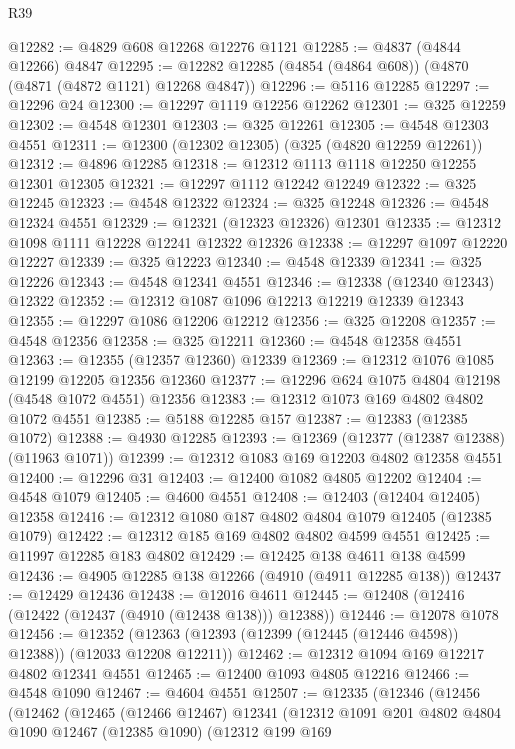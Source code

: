 \begin{lexlean}{R39}
\begin{coremodule}
@12282 := @4829 @608 @12268 @12276 @1121
@12285 := @4837 (@4844 @12266) @4847
@12295 := @12282 @12285 (@4854 (@4864 @608)) (@4870 (@4871 (@4872 @1121) @12268 @4847))
@12296 := @5116 @12285
@12297 := @12296 @24
@12300 := @12297 @1119 @12256 @12262
@12301 := @325 @12259
@12302 := @4548 @12301
@12303 := @325 @12261
@12305 := @4548 @12303 @4551
@12311 := @12300 (@12302 @12305) (@325 (@4820 @12259 @12261))
@12312 := @4896 @12285
@12318 := @12312 @1113 @1118 @12250 @12255 @12301 @12305
@12321 := @12297 @1112 @12242 @12249
@12322 := @325 @12245
@12323 := @4548 @12322
@12324 := @325 @12248
@12326 := @4548 @12324 @4551
@12329 := @12321 (@12323 @12326) @12301
@12335 := @12312 @1098 @1111 @12228 @12241 @12322 @12326
@12338 := @12297 @1097 @12220 @12227
@12339 := @325 @12223
@12340 := @4548 @12339
@12341 := @325 @12226
@12343 := @4548 @12341 @4551
@12346 := @12338 (@12340 @12343) @12322
@12352 := @12312 @1087 @1096 @12213 @12219 @12339 @12343
@12355 := @12297 @1086 @12206 @12212
@12356 := @325 @12208
@12357 := @4548 @12356
@12358 := @325 @12211
@12360 := @4548 @12358 @4551
@12363 := @12355 (@12357 @12360) @12339
@12369 := @12312 @1076 @1085 @12199 @12205 @12356 @12360
@12377 := @12296 @624 @1075 @4804 @12198 (@4548 @1072 @4551) @12356
@12383 := @12312 @1073 @169 @4802 @4802 @1072 @4551
@12385 := @5188 @12285 @157
@12387 := @12383 (@12385 @1072)
@12388 := @4930 @12285
@12393 := @12369 (@12377 (@12387 @12388) (@11963 @1071))
@12399 := @12312 @1083 @169 @12203 @4802 @12358 @4551
@12400 := @12296 @31
@12403 := @12400 @1082 @4805 @12202
@12404 := @4548 @1079
@12405 := @4600 @4551
@12408 := @12403 (@12404 @12405) @12358
@12416 := @12312 @1080 @187 @4802 @4804 @1079 @12405 (@12385 @1079)
@12422 := @12312 @185 @169 @4802 @4802 @4599 @4551
@12425 := @11997 @12285 @183 @4802
@12429 := @12425 @138 @4611 @138 @4599
@12436 := @4905 @12285 @138 @12266 (@4910 (@4911 @12285 @138))
@12437 := @12429 @12436
@12438 := @12016 @4611
@12445 := @12408 (@12416 (@12422 (@12437 (@4910 (@12438 @138))) @12388))
@12446 := @12078 @1078
@12456 := @12352 (@12363 (@12393 (@12399 (@12445 (@12446 @4598)) @12388)) (@12033 @12208 @12211))
@12462 := @12312 @1094 @169 @12217 @4802 @12341 @4551
@12465 := @12400 @1093 @4805 @12216
@12466 := @4548 @1090
@12467 := @4604 @4551
@12507 := @12335
    (@12346
      (@12456
        (@12462
          (@12465
            (@12466 @12467)
            @12341
            (@12312
              @1091
              @201
              @4802
              @4804
              @1090
              @12467
              (@12385 @1090)
              (@12312
                @199
                @169

\end{coremodule}
\end{lexlean}
